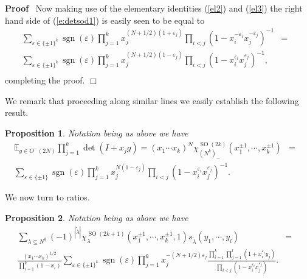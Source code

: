 \documentclass[11pt]{amsart}
\newcommand{\tmop}[1]{\ensuremath{\operatorname{#1}}}
\newtheorem{proposition}{Proposition}
\renewenvironment{proof}{
\noindent\textbf{Proof}\ }{\hspace*{\fill}
\begin{math}\Box\end{math}\medskip}
\begin{document}
\begin{proof}
  Now making use of the elementary identities (\ref{el2}) and (\ref{el3}) the
  right hand side of (\ref{e:detsod1}) is easily seen to be equal to
  \begin{eqnarray*}
    \sum_{\varepsilon \in \{ \pm 1 \}^k} \tmop{sgn} ( \varepsilon ) \prod_{j =
    1}^k x_j^{( N + 1 / 2 ) ( 1 + \varepsilon_j )} \prod_{i < j} ( 1 - x_i^{-
    \varepsilon_i} x_j^{- \varepsilon_j} )^{- 1} & = & \\
    \sum_{\varepsilon \in \{ \pm 1 \}^k} \tmop{sgn} ( \varepsilon ) \prod_{j =
    1}^k x_j^{( N + 1 / 2 ) ( 1 - \varepsilon_j )} \prod_{i < j} ( 1 -
    x_i^{\varepsilon_i} x_j^{\varepsilon_j} )^{- 1}, &  & \\
    &  &
  \end{eqnarray*}
  completing the proof.
\end{proof}

We remark that proceeding along similar lines we easily establish
the following result.

\begin{proposition}
  \label{prosmin}Notation being as above we have
  \begin{eqnarray*}
    \mathbb{E}_{g \in O^- ( 2 N )} \prod_{j = 1}^k \det ( I + x_j g ) = ( x_1
    \cdots x_k )^N \chi_{( N^k )_-}^{\tmop{SO} ( 2 k )} ( x_1^{\pm 1}, \cdots,
    x_k^{\pm 1} ) & = & \\
    \sum_{\varepsilon \in \{ \pm 1 \}} \tmop{sgn} ( \varepsilon ) \prod_{j =
    1}^k x_j^{N ( 1 - \varepsilon_j )} \prod_{i < j} ( 1 - x_i^{\varepsilon_i}
    x_j^{\varepsilon_j} )^{- 1} . &  &
  \end{eqnarray*}
\end{proposition}

We now turn to ratios.

\begin{proposition}
  \label{prop:altsod}Notation being as above we have
  \begin{eqnarray}
    \sum_{\lambda \subseteq N^k} ( - 1 )^{| \tilde{\lambda} |}
    \chi_{\lambda}^{\tmop{SO} ( 2 k + 1 )} ( x_1^{\pm 1}, \cdots, x_k^{\pm 1},
    1 ) s_{\tilde{\lambda}} ( y_1, \cdots, y_l ) & = &  \label{e:altsod1}\\
    \frac{( x_1 \cdots x_k )^{1 / 2}}{\prod_{i = 1}^k ( 1 - x_i )}
    \sum_{\varepsilon \in \{ \pm 1 \}^k} \tmop{sgn} ( \varepsilon ) \prod_{j =
    1}^k x_j^{- ( N + 1 / 2 ) \varepsilon_j} \frac{\prod_{i = 1}^k \prod_{j =
    1}^l ( 1 + x_i^{\varepsilon_i} y_j )}{\prod_{i < j} ( 1 -
    x_i^{\varepsilon_i} x_j^{\varepsilon_j} )} . &  &  \nonumber
  \end{eqnarray}
\end{proposition}
\end{document}
